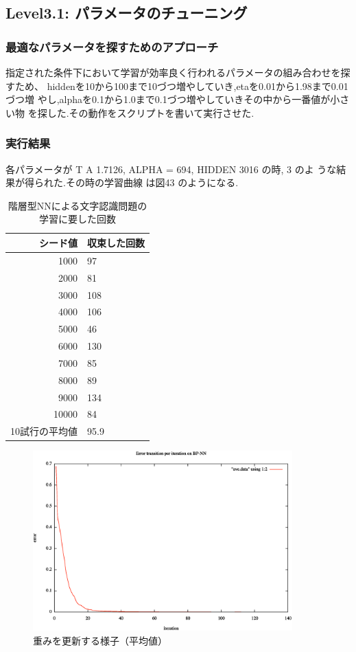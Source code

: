 \subsection{Level3.1: パラメータのチューニング}%
\subsubsection{最適なパラメータを探すためのアプローチ}
指定された条件下において学習が効率良く行われるパラメータの組み合わせを探
すため、
hiddenを10から100まで10づつ増やしていき,etaを0.01から1.98まで0.01づつ増
やし,alphaを0.1から1.0まで0.1づつ増やしていきその中から一番値が小さい物
を探した.その動作をスクリプトを書いて実行させた.

\subsubsection{実行結果}
各パラメータが T A 1.7126, ALPHA = 694, HIDDEN 3016 の時, 3 のよ
うな結果が得られた.その時の学習曲線 は図43 のようになる.
\begin{table}[htb]
 \begin{center}
  \caption{階層型NNによる文字認識問題の学習に要した回数}
  \label{table:level3}
  \begin{tabular}[htb]{r|l} \hline
   シード値 & 収束した回数 \\ \hline \hline
   1000 & 97 \\ \hline
   2000 & 81 \\ \hline
   3000 & 108 \\ \hline
   4000 & 106 \\ \hline
   5000 & 46 \\ \hline
   6000 & 130 \\ \hline
   7000 & 85 \\ \hline
   8000 & 89 \\ \hline
   9000 & 134 \\ \hline
   10000 & 84 \\ \hline \hline
   10試行の平均値 & 95.9 \\ \hline
  \end{tabular}
 \end{center}
\end{table}

\begin{figure}[h]
 \begin{center}
  \includegraphics[width=10.0cm]{ave.eps}
  \caption{重みを更新する様子（平均値）}
  \label{fig:level2}
 \end{center}
\end{figure}
\newpage


